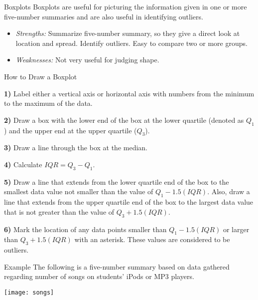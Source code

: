 \documentclass[Lecture.tex]{subfiles}
\begin{document}
\begin{frame}{Boxplots}
Boxplots are useful for picturing the information given in one or more five-number summaries and are also useful in identifying outliers.\\ \pause
\begin{itemize}
\item<1->
{\it Strengths:}  Summarize five-number summary, so they give a direct look at location and spread.  Identify outliers.  Easy to compare two or more groups.
\item<2->
{\it Weaknesses:} Not very useful for judging shape.
\end{itemize}
\end{frame}

\begin{frame}{How to Draw a Boxplot}

{\bf 1)}  Label either a vertical axis or horizontal axis with numbers from the minimum to the maximum of the data.\pause

{\bf 2)}  Draw a box with the lower end of the box at the lower quartile (denoted as $Q_1$) and the upper end at the upper quartile ($Q_3$).\pause

{\bf 3)}  Draw a line through the box at the median.\pause

{\bf 4)}  Calculate $IQR=Q_3-Q_1$.\pause

{\bf 5)}  Draw a line that extends from the lower quartile end of the box to the smallest data value not smaller than the value of $Q_1-1.5(IQR)$.  Also, draw a line that extends from the upper quartile end of the box to the largest data value that is not greater than the value of $Q_3+1.5(IQR)$.\pause

{\bf 6)}  Mark the location of any data points smaller than $Q_1-1.5(IQR)$ or larger than $Q_3+1.5(IQR)$ with an asterisk.  These values are considered to be outliers.

\end{frame}


\begin{frame}{Example}
The following is a five-number summary based on data gathered regarding number of songs on students' iPods or MP3 players.  
\begin{center}
\texttt{[image: songs]}
\end{center}
\end{frame}
\end{document}
